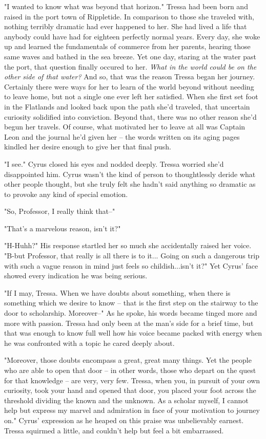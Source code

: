 "I wanted to know what was beyond that horizon." Tressa had been born and raised in the port town of Rippletide. In comparison to those she traveled with, nothing terribly dramatic had ever happened to her. She had lived a life that anybody could have had for eighteen perfectly normal years. Every day, she woke up and learned the fundamentals of commerce from her parents, hearing those same waves and bathed in the sea breeze. Yet one day, staring at the water past the port, that question finally occured to her. \emph{What in the world could be on the other side of that water?} And so, that was the reason Tressa began her journey. Certainly there were ways for her to learn of the world beyond without needing to leave home, but not a single one ever left her satisfied. When she first set foot in the Flatlands and looked back upon the path she'd traveled, that uncertain curiosity solidified into conviction. Beyond that, there was no other reason she'd begun her travels. Of course, what motivated her to leave at all was Captain Leon and the journal he'd given her -- the words written on its aging pages kindled her desire enough to give her that final push.

"I see." Cyrus closed his eyes and nodded deeply. Tressa worried she'd disappointed him. Cyrus wasn't the kind of person to thoughtlessly deride what other people thought, but she truly felt she hadn't said anything so dramatic as to provoke any kind of special emotion.

"So, Professor, I really think that--"

"That's a marvelous reason, isn't it?"

"H-Huhh?" His response startled her so much she accidentally raised her voice. "B-but Professor, that really is all there is to it... Going on such a dangerous trip with such a vague reason in mind just feels so childish...isn't it?" Yet Cyrus' face showed every indication he was being serious.

"If I may, Tressa. When we have doubts about something, when there is something which we desire to know -- that is the first step on the stairway to the door to scholarship. Moreover--" As he spoke, his words became tinged more and more with passion. Tressa had only been at the man's side for a brief time, but that was enough to know full well how his voice became packed with energy when he was confronted with a topic he cared deeply about.

"Moreover, those doubts encompass a great, great many things. Yet the people who are able to open that door -- in other words, those who depart on the quest for that knowledge -- are very, very few. Tressa, when you, in pursuit of your own curiosity, took your hand and opened that door, you placed your foot across the threshold dividing the known and the unknown. As a scholar myself, I cannot help but express my marvel and admiration in face of your motivation to journey on." Cyrus' expression as he heaped on this praise was unbelievably earnest. Tressa squirmed a little, and couldn't help but feel a bit embarrassed.

